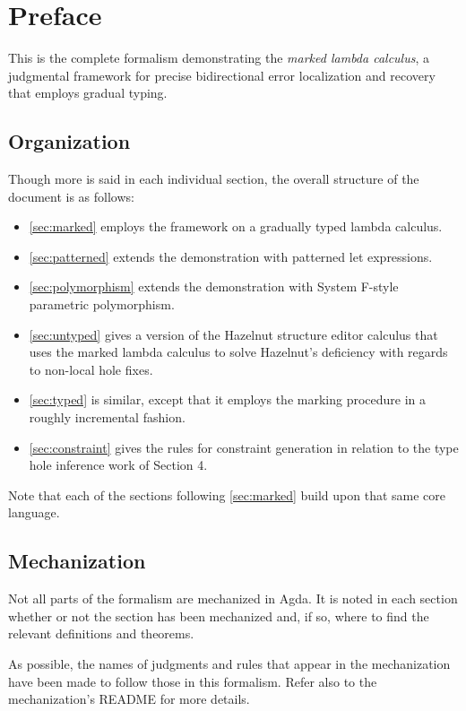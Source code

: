 \documentclass[formalism.tex]{subfiles}
\begin{document}
\section{Preface}
\label{sec:preface}
This is the complete formalism demonstrating the \emph{marked lambda calculus}, a judgmental framework for
precise bidirectional error localization and recovery that employs gradual typing.

\subsection{Organization}
Though more is said in each individual section, the overall structure of the document is as follows:
%
\begin{itemize}
  \item \cref{sec:marked} employs the framework on a gradually typed lambda calculus.

  \item \cref{sec:patterned} extends the demonstration with patterned let expressions.

  \item \cref{sec:polymorphism} extends the demonstration with System F-style parametric
    polymorphism.

  \item \cref{sec:untyped} gives a version of the Hazelnut structure editor calculus that uses the
    marked lambda calculus to solve Hazelnut's deficiency with regards to non-local hole fixes.

  \item \cref{sec:typed} is similar, except that it employs the marking procedure in a roughly
    incremental fashion.

  \item \cref{sec:constraint} gives the rules for constraint generation in relation to the type hole
    inference work of Section 4.
\end{itemize}
%
Note that each of the sections following \cref{sec:marked} build upon that same core language.

\subsection{Mechanization}
Not all parts of the formalism are mechanized in Agda. It is noted in each section whether or not
the section has been mechanized and, if so, where to find the relevant definitions and theorems.

As possible, the names of judgments and rules that appear in the mechanization have been made to
follow those in this formalism. Refer also to the mechanization's README for more details.
\end{document}
